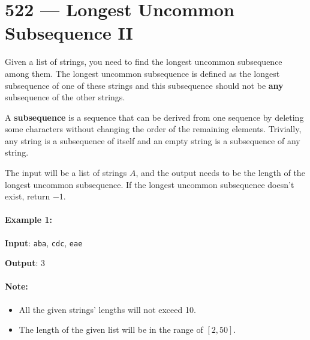 \section{522 --- Longest Uncommon Subsequence II}
Given a list of strings, you need to find the longest uncommon subsequence among them. The longest uncommon subsequence is defined as the longest subsequence of one of these strings and this subsequence should not be \textbf{any} subsequence of the other strings.

A \textbf{subsequence} is a sequence that can be derived from one sequence by deleting some characters without changing the order of the remaining elements. Trivially, any string is a subsequence of itself and an empty string is a subsequence of any string.

The input will be a list of strings $ A $, and the output needs to be the length of the longest uncommon subsequence. If the longest uncommon subsequence doesn't exist, return $-1$.

\paragraph{Example 1:}

\begin{flushleft}
\textbf{Input}: \texttt{aba}, \texttt{cdc}, \texttt{eae}

\textbf{Output}: 3

\end{flushleft}

\paragraph{Note:}

\begin{itemize}
\item All the given strings' lengths will not exceed 10.
\item The length of the given list will be in the range of $[2, 50]$.
\end{itemize}